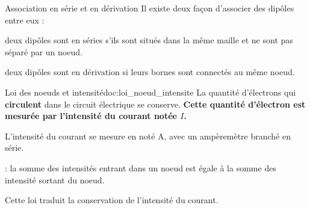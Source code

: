 

\begin{doc}{Association en série et en dérivation}
  Il existe deux façon d'associer des dipôles entre eux :
  \begin{listePoints}
    \item deux dipôles sont en séries s'ils sont situés dans la même maille et ne sont pas séparé par un noeud.
    \item deux dipôles sont en dérivation si leurs bornes sont connectés au même noeud.
  \end{listePoints}
\end{doc}

\newpage
\vspace*{-28pt}


\begin{doc}{Loi des noeuds et intensité}{doc:loi_noeud_intensite}
  \chevron La quantité d'électrons qui \textbf{circulent} dans le circuit électrique se conserve.
  \textbf{Cette quantité d'électron est mesurée par l'intensité du courant notée $I$.}
  \begin{encart}
    L'intensité du courant se mesure en  noté A, avec un ampèremètre branché en série.
  \end{encart}
  \begin{encart}
     : la somme des intensités entrant dans un noeud est égale à la somme des intensité sortant du noeud.
  \end{encart}
  Cette loi traduit la conservation de l'intensité du courant.
\end{doc}



